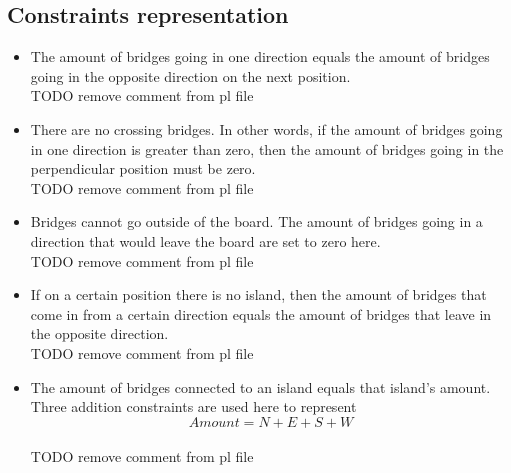 \documentclass{report}
\begin{document}
\subsection{Constraints representation}
\begin{itemize}
	\item The amount of bridges going in one direction equals the amount of bridges going in the opposite direction on the next position.
	    \\TODO remove comment from pl file
		
	\item There are no crossing bridges. In other words, if the amount of bridges going in one direction is greater than zero, then the amount of bridges going in the perpendicular position must be zero.
	    \\TODO remove comment from pl file
		
	\item Bridges cannot go outside of the board. The amount of bridges going in a direction that would leave the board are set to zero here.
	    \\TODO remove comment from pl file
        
	\item If on a certain position there is no island, then the amount of bridges that come in from a certain direction equals the amount of bridges that leave in the opposite direction.
	    \\TODO remove comment from pl file
        
	\item The amount of bridges connected to an island equals that island's amount. Three addition constraints are used here to represent \[ Amount = N + E + S + W \]
	    \\TODO remove comment from pl file
        
\end{itemize}
\end{document}
